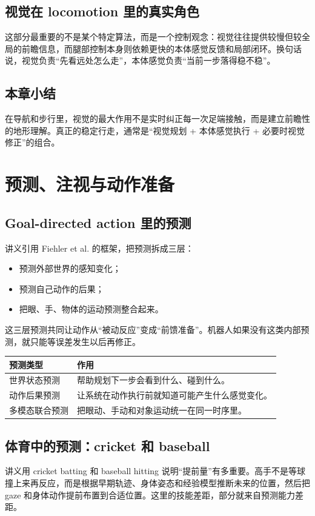 \documentclass[a4paper]{article}
\begin{document}
\subsection{视觉在 locomotion 里的真实角色}
这部分最重要的不是某个特定算法，而是一个控制观念：视觉往往提供较慢但较全局的前瞻信息，而腿部控制本身则依赖更快的本体感觉反馈和局部闭环。换句话说，视觉负责“先看远处怎么走”，本体感觉负责“当前一步落得稳不稳”。

\subsection{本章小结}
在导航和步行里，视觉的最大作用不是实时纠正每一次足端接触，而是建立前瞻性的地形理解。真正的稳定行走，通常是“视觉规划 + 本体感觉执行 + 必要时视觉修正”的组合。

\section{预测、注视与动作准备}

\subsection{Goal-directed action 里的预测}
讲义引用 Fiehler et al. 的框架，把预测拆成三层：
\begin{itemize}
  \item 预测外部世界的感知变化；
  \item 预测自己动作的后果；
  \item 把眼、手、物体的运动预测整合起来。
\end{itemize}
这三层预测共同让动作从“被动反应”变成“前馈准备”。机器人如果没有这类内部预测，就只能等误差发生以后再修正。

\begin{table}[H]
\centering
\begin{tabular}{p{}p{}}
\toprule
预测类型 & 作用 \\
\midrule
世界状态预测 & 帮助规划下一步会看到什么、碰到什么。 \\
动作后果预测 & 让系统在动作执行前就知道可能产生什么感觉变化。 \\
多模态联合预测 & 把眼动、手动和对象运动统一在同一时序里。 \\
\bottomrule
\end{tabular}
\end{table}

\subsection{体育中的预测：cricket 和 baseball}
讲义用 cricket batting 和 baseball hitting 说明“提前量”有多重要。高手不是等球撞上来再反应，而是根据早期轨迹、身体姿态和经验模型推断未来的位置，然后把 gaze 和身体动作提前布置到合适位置。这里的技能差距，部分就来自预测能力差距。
\end{document}
